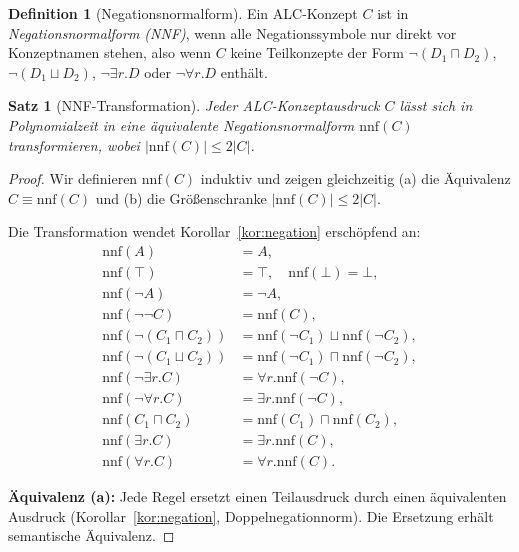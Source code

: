 ﻿\documentclass[a4paper,12pt]{article}
\theoremstyle{definition}
\newtheorem{definition}{Definition}[section]
\theoremstyle{plain}
\newtheorem{satz}{Satz}[section]
\theoremstyle{remark}
\begin{document}
\begin{definition}[Negationsnormalform]
Ein \textsf{ALC}-Konzept $C$ ist in \emph{Negationsnormalform (NNF)},
wenn alle Negationssymbole nur direkt vor Konzeptnamen stehen,
also wenn $C$ keine Teilkonzepte der Form $\neg(D_1 \sqcap D_2)$,
$\neg(D_1 \sqcup D_2)$, $\neg \exists r.D$ oder $\neg \forall r.D$ enth{\"{a}}lt.
\end{definition}

\begin{satz}[NNF-Transformation]
\label{satz:nnf}
Jeder \textsf{ALC}-Konzeptausdruck $C$ l{\"{a}}sst sich in Polynomialzeit
in eine {\"{a}}quivalente Negationsnormalform $\mathrm{nnf}(C)$ transformieren,
wobei $|\mathrm{nnf}(C)| \leq 2|C|$.
\end{satz}

\begin{proof}
Wir definieren $\mathrm{nnf}(C)$ induktiv und zeigen
gleichzeitig (a) die {\"{A}}quivalenz $C \equiv \mathrm{nnf}(C)$
und (b) die Gr{\"{o}}{\ss}enschranke $|\mathrm{nnf}(C)| \leq 2|C|$.

Die Transformation wendet Korollar~\ref{kor:negation} ersch{\"{o}}pfend an:
\begin{align*}
  \mathrm{nnf}(A) &= A, \\
  \mathrm{nnf}(\top) &= \top, \quad
  \mathrm{nnf}(\bot) = \bot, \\
  \mathrm{nnf}(\neg A) &= \neg A, \\
  \mathrm{nnf}(\neg\neg C) &= \mathrm{nnf}(C), \\
  \mathrm{nnf}(\neg(C_1 \sqcap C_2)) &=
    \mathrm{nnf}(\neg C_1) \sqcup \mathrm{nnf}(\neg C_2), \\
  \mathrm{nnf}(\neg(C_1 \sqcup C_2)) &=
    \mathrm{nnf}(\neg C_1) \sqcap \mathrm{nnf}(\neg C_2), \\
  \mathrm{nnf}(\neg \exists r.C) &=
    \forall r.\mathrm{nnf}(\neg C), \\
  \mathrm{nnf}(\neg \forall r.C) &=
    \exists r.\mathrm{nnf}(\neg C), \\
  \mathrm{nnf}(C_1 \sqcap C_2) &=
    \mathrm{nnf}(C_1) \sqcap \mathrm{nnf}(C_2), \\
  \mathrm{nnf}(\exists r.C) &= \exists r.\mathrm{nnf}(C), \\
  \mathrm{nnf}(\forall r.C) &= \forall r.\mathrm{nnf}(C).
\end{align*}

\textbf{{\"{A}}quivalenz (a):}
Jede Regel ersetzt einen Teilausdruck durch einen {\"{a}}quivalenten
Ausdruck (Korollar~\ref{kor:negation}, Doppelnegationnorm).
Die Ersetzung erh{\"{a}}lt semantische {\"{A}}quivalenz.


\end{proof}
\end{document}
